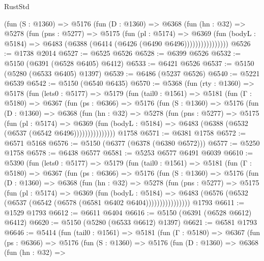 \begin{lexlean}{RustStd}
\begin{coremodule}
                (fun (S : @1360) =>
                @5176
                  (fun (D : @1360) =>
                  @6368
                    (fun (hn : @32) =>
                    @5278
                      (fun (pns : @5277) =>
                      @5175
                        (fun (pl : @5174) =>
                        @6369
                          (fun (bodyL : @5184) =>
                          @6483 (@6388 (@6414 (@6426 (@6490 @6496))))))))))))))))
@6526 := @1738 @2014
@6527 := @6525 @6526
@6528 := @6399 @6526
@6532 := @5150 (@6391 (@6528 @6405) @6412)
@6533 := @6421 @6526
@6537 := @5150 (@5280 (@6533 @6405) @1397)
@6539 := @6486 (@5237 @6526)
@6540 := @5221 @6539
@6542 := @5150 (@6540 @6435)
@6570 := @5368
    (fun (rty : @1360) =>
    @5178
      (fun (lets0 : @5177) =>
      @5179
        (fun (tail0 : @1561) =>
        @5181
          (fun (Γ : @5180) =>
          @6367
            (fun (ps : @6366) =>
            @5176
              (fun (S : @1360) =>
              @5176
                (fun (D : @1360) =>
                @6368
                  (fun (hn : @32) =>
                  @5278
                    (fun (pns : @5277) =>
                    @5175
                      (fun (pl : @5174) =>
                      @6369
                        (fun (bodyL : @5184) =>
                        @6483 (@6388 (@6532 (@6537 (@6542 @6496)))))))))))))))
    @1758
@6571 := @6381 @1758
@6572 := @6571 @5168
@6576 := @5150 (@6377 (@6378 (@6380 @6572)))
@6577 := @5250 @1758
@6578 := @6438 @6577
@6581 := @5253 @6577 @6491 @6039
@6610 := @5390
    (fun (lets0 : @5177) =>
    @5179
      (fun (tail0 : @1561) =>
      @5181
        (fun (Γ : @5180) =>
        @6367
          (fun (ps : @6366) =>
          @5176
            (fun (S : @1360) =>
            @5176
              (fun (D : @1360) =>
              @6368
                (fun (hn : @32) =>
                @5278
                  (fun (pns : @5277) =>
                  @5175
                    (fun (pl : @5174) =>
                    @6369
                      (fun (bodyL : @5184) =>
                      @6483 (@6576 (@6532 (@6537 (@6542 (@6578 (@6581 @6402 @6404))))))))))))))))
    @1793
@6611 := @1529 @1793
@6612 := @6611 @6404
@6616 := @5150 (@6391 (@6528 @6612) @6412)
@6620 := @5150 (@5280 (@6533 @6612) @1397)
@6621 := @6581 @1793
@6646 := @5414
    (fun (tail0 : @1561) =>
    @5181
      (fun (Γ : @5180) =>
      @6367
        (fun (ps : @6366) =>
        @5176
          (fun (S : @1360) =>
          @5176
            (fun (D : @1360) =>
            @6368
              (fun (hn : @32) =>

\end{coremodule}
\end{lexlean}
